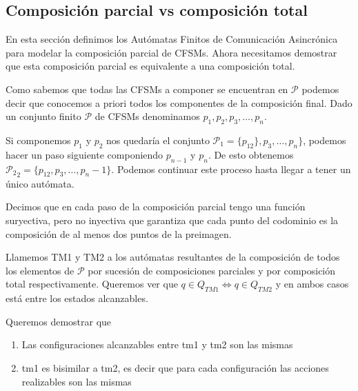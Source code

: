 \newpage
\subsection{Composición parcial vs composición total}

En esta sección definimos los Autómatas Finitos de Comunicación Asincrónica para modelar la composición parcial de CFSMs. Ahora necesitamos demostrar que esta composición parcial es equivalente a una composición total.

Como sabemos que todas las CFSMs a componer se encuentran en $\mathcal{P}$ podemos decir que conocemos a priori todos los componentes de la composición final. Dado un conjunto finito $\mathcal{P}$ de CFSMs denominamos $ p_1, p_2, p_3, \ldots, p_n$. 

Si componemos $p_1$ y $p_2$ nos quedaría el conjunto $\mathcal{P}_1 =\{ p_{12} \}, p_3, \ldots, p_n \} $, podemos hacer un paso siguiente componiendo $p_{n-1}$ y $p_n$. De esto obtenemos $\mathcal{P_2}_2= \{ p_{12}, p_3, \ldots, p_n-1 \} $. Podemos continuar este proceso hasta llegar a tener un único autómata. %

Decimos que en cada paso de la composición parcial tengo una función suryectiva, pero no inyectiva que garantiza que cada punto del codominio es la composición de al menos dos puntos de la preimagen.

Llamemos TM1 y TM2 a los autómatas resultantes de la composición de todos los elementos de $\mathcal{P}$ por sucesión de composiciones parciales y por composición total respectivamente. Queremos ver que $ q \in Q_{TM1} \iff q \in Q_{TM2} $ y en ambos casos está entre los estados alcanzables. 

Queremos demostrar que
\begin{enumerate}
\item Las configuraciones alcanzables entre tm1 y tm2 son las mismas
\item tm1 es bisimilar a tm2, es decir que para cada configuración las acciones realizables son las mismas
\end{enumerate}

